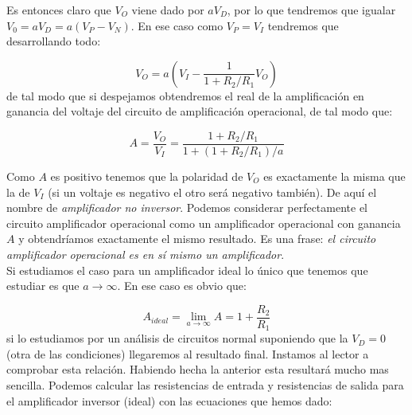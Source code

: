 \documentclass[11pt]{article} %
\newcommand{\parentesis}[1]{\left( #1  \right)}
\begin{document}
Es entonces claro que $V_O$ viene dado por $aV_D$, por lo que tendremos que igualar $V_0 = a V_D = a (V_P - V_N)$. En ese caso como $V_P = V_I$ tendremos que desarrollando todo:

\begin{equation}
V_O = a \parentesis{V_I - \dfrac{1}{1+R_2/R_1} V_O} 
\end{equation} 
de tal modo que si despejamos obtendremos el real de la amplificación en ganancia del voltaje del circuito de amplificación operacional, de tal modo que:

\begin{equation}
A = \dfrac{V_O}{V_I} = \dfrac{1+R_2/R_1}{1+(1+R_2/R_1)/a}
\end{equation}

Como $A$ es positivo tenemos que la polaridad de $V_O$ es exactamente la misma que la de $V_I$ (si un voltaje es negativo el otro será negativo también). De aquí el nombre de \textit{amplificador no inversor}. Podemos considerar perfectamente el circuito amplificador operacional como un amplificador operacional con ganancia $A$ y obtendríamos exactamente el mismo resultado. Es una frase: \textit{el circuito amplificador operacional es en sí mismo un amplificador}. \\





Si estudiamos el caso para un amplificador ideal lo único que tenemos que estudiar es que $a \rightarrow \infty$. En ese caso es obvio que:

\begin{equation}
A_{ideal} = \lim_{a \rightarrow \infty} A = 1 + \dfrac{R_2}{R_1}
\end{equation}
si lo estudiamos por un análisis de circuitos normal suponiendo que la $V_D = 0$ (otra de las condiciones) llegaremos al resultado final. Instamos al lector a comprobar esta relación. Habiendo hecha la anterior esta resultará mucho mas sencilla. Podemos calcular las resistencias de entrada y resistencias de salida para el amplificador inversor (ideal) con las ecuaciones que hemos dado: \\
\end{document}
